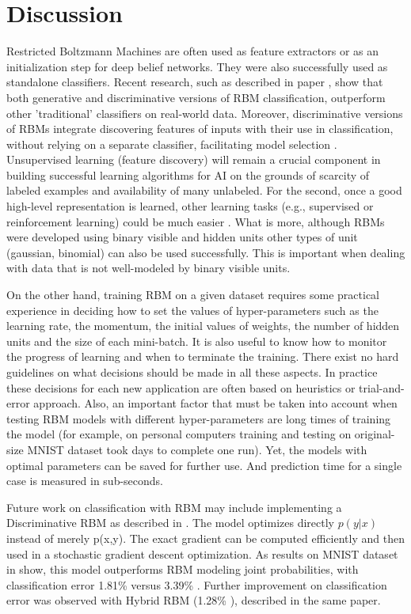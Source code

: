 \documentclass[a4paper]{scrartcl}
\begin{document}
\section{Discussion}
Restricted Boltzmann Machines are often used as feature extractors or as an initialization step for deep belief networks. They were also successfully used as standalone classifiers. Recent research, such as described in paper \cite{Schmah}, show that both generative and discriminative versions of RBM classification, outperform other 'traditional' classifiers on real-world data. Moreover, discriminative versions of RBMs integrate discovering features of inputs with their use in classification, without relying on a separate classifier, facilitating model selection \cite{Larochelle}. Unsupervised learning (feature discovery) will remain a crucial component in building successful learning algorithms for AI on the grounds of scarcity of labeled examples and availability of many unlabeled. For the second, once a good high-level representation is learned, other learning tasks (e.g., supervised or reinforcement learning) could be much easier \cite{Bengio}. 
What is more, although RBMs were developed using binary visible and hidden units other types of unit (gaussian, binomial) can also be used successfully. This is important when dealing with data that is not well-modeled by binary visible units.
\par On the other hand, training RBM on a given dataset requires some practical experience in deciding how to set the values of hyper-parameters such as the learning rate, the momentum, the initial values of weights, the number of hidden units and the size of each mini-batch. It is also useful to know how to monitor the progress of learning and when to terminate the training. There exist no hard guidelines on what decisions should be made in all these aspects. In practice these decisions for each new application are often based on heuristics or trial-and-error approach. Also, an important factor that must be taken into account when testing RBM models with different hyper-parameters are long times of training the model (for example, on personal computers training and testing on original-size MNIST dataset took days to complete one run). Yet, the models with optimal parameters can be saved for further use. And prediction time for a single case is measured in sub-seconds.
\par  
\par Future work on classification with RBM may include implementing a Discriminative RBM as described in \cite{Larochelle}. The model optimizes directly $p(y \vert x)$ instead of merely p(x,y). The exact gradient can be computed efficiently and then used in a stochastic gradient descent optimization. As results on MNIST dataset in \cite{Larochelle} show, this model outperforms RBM modeling joint probabilities, with classification error 1.81\% versus 3.39\% . Further improvement on classification error was observed with Hybrid RBM (1.28\% ), described in the same paper.
\end{document}
